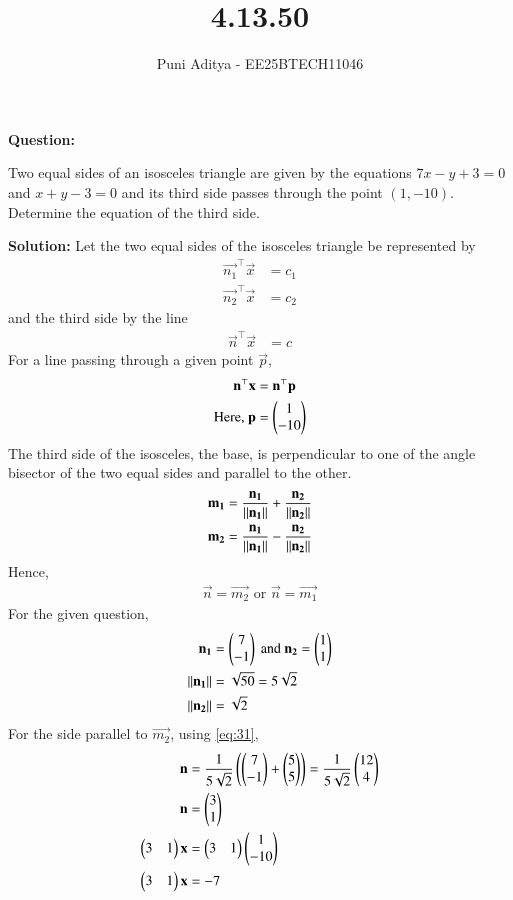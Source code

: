 \documentclass[journal]{IEEEtran}
\begin{document}
\title{4.13.50}
\author{Puni Aditya - EE25BTECH11046}
\maketitle

\textbf{Question:}

Two equal sides of an isosceles triangle are given by the equations $7x - y + 3 = 0$ and $x + y - 3 = 0$ and its third side passes through the point $(1, -10)$. Determine the equation of the third side.

\textbf{Solution:}
Let the two equal sides of the isosceles triangle be represented by
\begin{align*}
    \vec{n_1}^\top\vec{x} &= c_1 \\
    \vec{n_2}^\top\vec{x} &= c_2
\end{align*}
and the third side by the line
\begin{align*}
    \vec{n}^\top\vec{x} &= c
\end{align*}
For a line passing through a given point $\vec{p}$,
\begin{align}
	\mathbf{n}^\top\mathbf{x} &= \mathbf{n}^\top\mathbf{p} \\
    \text{Here, }\mathbf{p} &= \begin{pmatrix}1 \\ -10\end{pmatrix}
\end{align}
The third side of the isosceles, the base, is perpendicular to one of the angle bisector of the two equal sides and parallel to the other.
\begin{align}
    \mathbf{m_1} &= \frac{\mathbf{n_1}}{\left\lVert\mathbf{n_1}\right\rVert} + \frac{\mathbf{n_2}}{\left\lVert\mathbf{n_2}\right\rVert} \label{eq:31} \\
    \mathbf{m_2} &= \frac{\mathbf{n_1}}{\left\lVert\mathbf{n_1}\right\rVert} - \frac{\mathbf{n_2}}{\left\lVert\mathbf{n_2}\right\rVert} \label{eq:32}
\end{align}
Hence,
\begin{align}
	\vec{n} = \vec{m_2}\text{ or }\vec{n} = \vec{m_1}
\end{align}
For the given question,
\begin{align}
    \mathbf{n_1} &= \begin{pmatrix}7 \\ -1\end{pmatrix}\text{ and }\mathbf{n_2} = \begin{pmatrix}1 \\ 1\end{pmatrix} \\
    \left\lVert\mathbf{n_1}\right\rVert &= \sqrt{50} = 5\sqrt{2} \\
    \left\lVert\mathbf{n_2}\right\rVert &= \sqrt{2}
\end{align}
For the side parallel to $\vec{m_2}$, using \eqref{eq:31},
\begin{align}
    \mathbf{n} &= \frac{1}{5\sqrt{2}}\left(\begin{pmatrix}7 \\ -1\end{pmatrix} + \begin{pmatrix}5 \\ 5\end{pmatrix}\right) = \frac{1}{5\sqrt{2}}\begin{pmatrix}12 \\ 4\end{pmatrix} \\
    \mathbf{n} &= \begin{pmatrix}3 \\ 1\end{pmatrix} \\
    \begin{pmatrix}3 & 1\end{pmatrix}\mathbf{x} &= \begin{pmatrix}3 & 1\end{pmatrix}\begin{pmatrix}1 \\ -10\end{pmatrix} \\
	\begin{pmatrix}3 & 1\end{pmatrix}\mathbf{x} &= -7
\end{align}
\end{document}
